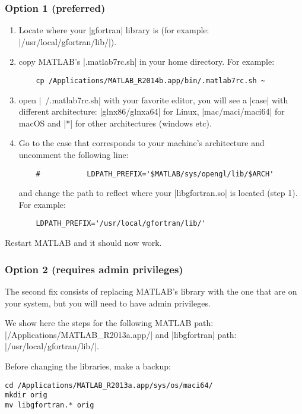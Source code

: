 \subsubsection{Option 1 (preferred)}
\begin{enumerate}
	\item Locate where your \lstinlinebg|gfortran| library is (for example: \lstinlinebg|/usr/local/gfortran/lib/|).
	\item copy MATLAB's \lstinlinebg|.matlab7rc.sh| in your home directory. For example:
	\begin{lstlisting}
	cp /Applications/MATLAB_R2014b.app/bin/.matlab7rc.sh ~
	\end{lstlisting}
	\item open \lstinlinebg|~/.matlab7rc.sh| with your favorite editor, you will see a \lstinlinebg|case| with different architecture: \lstinlinebg|glnx86/glnxa64| for Linux, \lstinlinebg|mac/maci/maci64| for macOS and \lstinlinebg|*| for other architectures (windows etc). 
	\item Go to the case that corresponds to your machine's architecture and uncomment the following line:
	\begin{lstlisting}
	#           LDPATH_PREFIX='$MATLAB/sys/opengl/lib/$ARCH'
	\end{lstlisting}
	and change the path to reflect where your \lstinlinebg|libgfortran.so| is located (step 1). For example:
	\begin{lstlisting}
	LDPATH_PREFIX='/usr/local/gfortran/lib/'
	\end{lstlisting}
\end{enumerate}

Restart MATLAB and it should now work.

\subsubsection{Option 2 (requires admin privileges)}
The second fix consists of replacing MATLAB's library with the one that are on your system, but you will need to have admin privileges.

We show here the steps for the following MATLAB path: \lstinlinebg|/Applications/MATLAB_R2013a.app/| and \lstinlinebg|libgfortran| path: \lstinlinebg|/usr/local/gfortran/lib/|.

Before changing the libraries, make a backup:
\begin{lstlisting}
cd /Applications/MATLAB_R2013a.app/sys/os/maci64/
mkdir orig
mv libgfortran.* orig
\end{lstlisting}


